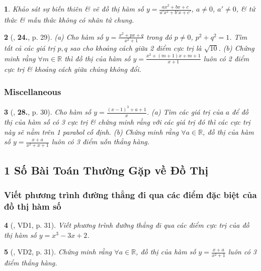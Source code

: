 \documentclass{article}
\newtheorem{baitoan}{}
\begin{document}
\begin{baitoan}
	Khảo sát sự biến thiên \& vẽ đồ thị hàm số $y = \frac{ax^2 + bx + c}{a'x^2 + b'x + c'}$, $a\ne 0$, $a'\ne 0$, \& tử thức \& mẫu thức không có nhân tử chung.
\end{baitoan}

\begin{baitoan}[\cite{TLCT_giai_tich_12}, \textbf{24.}, p. 29]
	(a) Cho hàm số $y = \frac{x^2 + px + q}{x^2 + 1}$ trong đó $p\ne 0$, $p^2 + q^2 = 1$. Tìm tất cả các giá trị $p,q$ sao cho khoảng cách giữa 2 điểm cực trị là $\sqrt{10}$. (b) Chứng minh rằng $\forall m\in\mathbb{R}$ thì đồ thị của hàm số $y = \frac{x^2 + (m + 1)x + m + 1}{x + 1}$ luôn có 2 điểm cực trị \& khoảng cách giữa chúng không đổi.	
\end{baitoan}

\subsubsection{Miscellaneous}

\begin{baitoan}[\cite{TLCT_giai_tich_12}, \textbf{28.}, p. 30]
	Cho hàm số $y = \frac{(x - 1)^3 + a + 1}{x}$. (a) Tìm các giá trị của $a$ để đồ thị của hàm số có 3 cực trị \& chứng minh rằng với các giá trị đó thì các cực trị này sẽ nằm trên 1 parabol cố định. (b) Chứng minh rằng $\forall a\in\mathbb{R}$, đồ thị của hàm số $y = \frac{x + a}{x^2 + x + 1}$ luôn có 3 điểm uốn thẳng hàng.	
\end{baitoan}


\subsection{1 Số Bài Toán Thường Gặp về Đồ Thị}

\subsubsection{Viết phương trình đường thẳng đi qua các điểm đặc biệt của đồ thị hàm số}

\begin{baitoan}[\cite{TLCT_giai_tich_12}, VD1, p. 31]
	Viết phương trình đường thẳng đi qua các điểm cực trị của đồ thị hàm số $y = x^3 - 3x + 2$.
\end{baitoan}

\begin{baitoan}[\cite{TLCT_giai_tich_12}, VD2, p. 31]
	Chứng minh rằng $\forall a\in\mathbb{R}$, đồ thị của hàm số $y = \frac{x + a}{x^2 + 1}$ luôn có 3 điểm thẳng hàng.
\end{baitoan}
\end{document}
